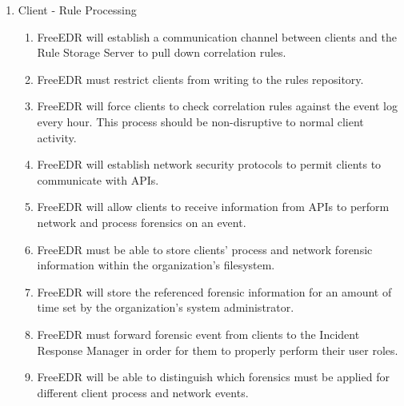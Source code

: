 \documentclass{scrreprt}
\begin{document}
\begin{enumerate}[label*=R\arabic*.]
    \item Client - Rule Processing
    \begin{enumerate}[label*=\arabic*.]
         \item FreeEDR will establish a communication channel between clients and the Rule Storage Server to pull down correlation rules.
	\item FreeEDR must restrict clients from writing to the rules repository.
\item FreeEDR will force clients to check correlation rules against the event log every hour. This process should be non-disruptive to normal client activity.
\item FreeEDR will establish network security protocols to permit clients to communicate with APIs.
\item FreeEDR will allow clients to receive information from APIs to perform network and process forensics on an event.
\item FreeEDR must be able to store clients’ process and network forensic information within the organization’s filesystem.
\item FreeEDR will store the referenced forensic information for an amount of time set by the organization’s system administrator.
\item FreeEDR must forward forensic event from clients to the Incident Response Manager in order for them to properly perform their user roles.
\item FreeEDR will be able to distinguish which forensics must be applied for different client process and network events.

    \end{enumerate}
\end{enumerate}
\end{document}
